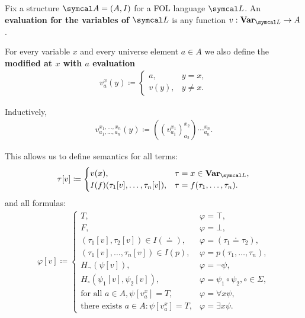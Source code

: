 \begin{definition}\label{def:first_order_evaluation}
  Fix a structure \( \Cal{A} = (A, I) \) for a FOL language \( \Cal{L} \). An \textbf{evaluation for the variables of \( \Cal{L} \)} is any function \( v: \Bold{Var}_{\Cal{L}} \to A \).

  For every variable \( x \) and every universe element \( a \in A \) we also define the \textbf{modified at \( x \) with \( a \) evaluation}
  \begin{align*}
    v_a^x(y) \coloneqq \begin{cases}
      a,    &y = x, \\
      v(y), &y \neq x.
    \end{cases}
  \end{align*}

  Inductively,
  \begin{align*}
    v_{a_1, \ldots, a_n}^{x_1, \ldots, x_n}(y) \coloneqq ((v_{a_1}^{x_1})_{a_2}^{x_2})\cdots_{a_n}^{x_n}.
  \end{align*}

  This allows us to define semantics for all terms:
  \begin{align*}
    \tau[v] \coloneqq \begin{cases}
      v(x),                               &\tau = x \in \Bold{Var}_{\Cal{L}}, \\
      I(f)(\tau_1[v], \ldots, \tau_n[v]), &\tau = f(\tau_1, \ldots, \tau_n).
    \end{cases}
  \end{align*}
  and all formulas:
  \begin{align*}
    \varphi[v] \coloneqq \begin{cases}
      T,                                                &\varphi = \top, \\
      F,                                                &\varphi = \bot, \\
      (\tau_1[v], \tau_2[v]) \in I(\doteq),             &\varphi = (\tau_1 \doteq \tau_2), \\
      (\tau_1[v], \ldots, \tau_n[v]) \in I(p),          &\varphi = p(\tau_1, \ldots, \tau_n), \\
      H_\neg(\psi[v]),                                  &\varphi = \neg \psi, \\
      H_\circ(\psi_1[v], \psi_2[v]),                    &\varphi = \psi_1 \circ \psi_2, \circ \in \Sigma, \\
      \text{for all } a \in A, \psi[v_a^x] = T,         &\varphi = \forall x \psi, \\
      \text{there exists } a \in A: \psi[v_a^x] = T,    &\varphi = \exists x \psi.
    \end{cases}
  \end{align*}


\end{definition}
